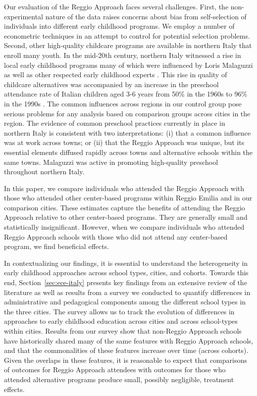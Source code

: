 Our evaluation of the Reggio Approach faces several challenges. First, the non-experimental nature of the data raises concerns about bias from self-selection of individuals into different early childhood programs. We employ a number of econometric techniques in an attempt to control for potential selection problems. Second, other high-quality childcare programs are available in northern Italy that enroll many youth. In the mid-20th century, northern Italy witnessed a rise in local early childhood programs many of which were influenced by Loris Malaguzzi as well as other respected early childhood experts \citep{OECD_2001_Italy-Country-Note}. This rise in quality of childcare alternatives was accompanied by an increase in the preschool attendance rate of Italian children aged 3-6 years from 50\% in the 1960s to 96\% in the 1990s \citep{Hohnerlein_2015_Development-and-Diffusion}. The common influences across regions in our control group pose serious problems for any analysis based on comparison groups across cities in the region.  The evidence of common preschool practices currently in place in northern Italy is consistent with two interpretations: (i) that a common influence was at work across towns; or (ii) that the Reggio Approach was unique, but its essential elements diffused rapidly across towns and alternative schools within the same towns. Malaguzzi was active in promoting high-quality preschool throughout northern Italy.

In this paper, we compare individuals who attended the Reggio Approach with those who attended other center-based programs within Reggio Emilia and in our comparison cities. These estimates capture the benefits of attending the Reggio Approach relative to other center-based programs. They are generally small and statistically insignificant. However, when we compare individuals who attended Reggio Approach schools with those who did not attend any center-based program, we find beneficial effects.

In contextualizing our findings, it is essential to understand the heterogeneity in early childhood approaches across school types, cities, and cohorts. Towards this end, Section~\ref{sec:ece-italy} presents key findings from an extensive review of the literature as well as results from a survey we conducted to quantify differences in administrative and pedagogical components among the different school types in the three cities. The survey allows us to track the evolution of differences in approaches to early childhood education across cities and across school-types within cities. Results from our survey show that non-Reggio Approach schools have historically shared many of the same features with Reggio Approach schools, and that the commonalities of these features increase over time (across cohorts). Given the overlaps in these features, it is reasonable to expect that comparisons of outcomes for Reggio Approach attendees with outcomes for those who attended alternative programs produce small, possibly negligible, treatment effects.

